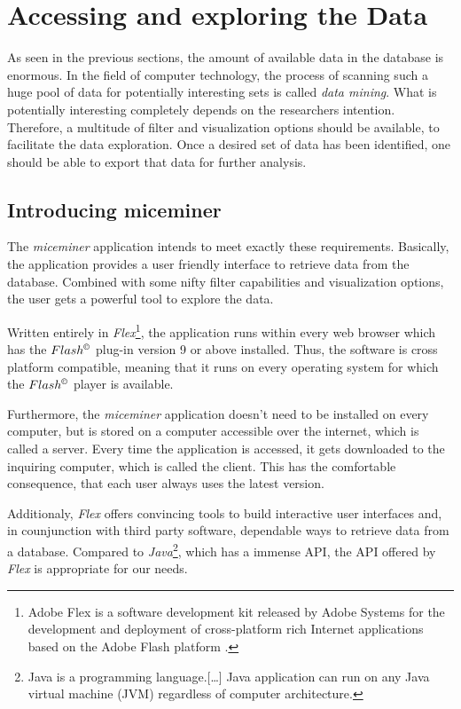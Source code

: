 \newpage
\section{Accessing and exploring the Data }
\label{sec:dataaccessandexp}

As seen in the previous sections, the amount of available data in the database is enormous. In the field of computer technology, the process of scanning such a huge pool of data for potentially interesting sets is called \textit{data mining}. What is potentially interesting completely depends on the researchers intention. Therefore, a multitude of filter and visualization options should be available, to facilitate the data exploration. Once a desired set of data has been identified, one should be able to export that data for further analysis. 

\subsection{Introducing miceminer}
\label{subsec:dataexp}

The \textit{miceminer} application intends to meet exactly these requirements. Basically, the application provides a user friendly interface to retrieve data from the database. Combined with some nifty filter capabilities and visualization options, the user gets a powerful tool to explore the data.

Written entirely in \textit{Flex}\footnote{Adobe Flex is a software development kit released by Adobe Systems for the development and deployment of cross-platform rich Internet applications based on the Adobe Flash platform \cite{wiki:flex}.}, the application runs within every web browser which has the $Flash^{\copyright}$ plug-in version 9 or above installed. Thus, the software is cross platform compatible, meaning that it runs on every operating system for which the $Flash^{\copyright}$ player is available. 

Furthermore, the \textit{miceminer} application doesn't need to be installed on every computer, but is stored on a computer accessible over the internet, which is called a server. Every time the application is accessed, it gets downloaded to the inquiring computer, which is called the client. This has the comfortable consequence, that each user always uses the latest version.

Additionaly, \textit{Flex} offers convincing tools to build interactive user interfaces and, in counjunction with third party software, dependable ways to retrieve data from a database. Compared to \textit{Java}\footnote{Java is a programming language.[\ldots] Java application can run on any Java virtual machine (JVM) regardless of computer architecture\cite{wiki:java}.}, which has a immense \ac{API}, the \ac{API} offered by \textit{Flex} is appropriate for our needs.

